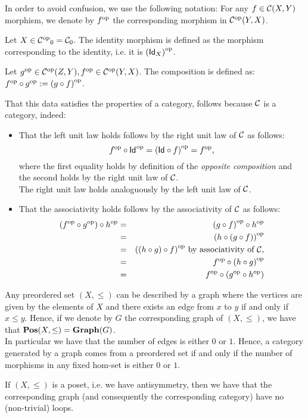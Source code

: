 \begin{solution}\label{sol:opposite}
  In order to avoid confusion, we use the following notation: For any $f\in\CHom{\CC}{X}{Y}$ morphism, we denote by $\op{f}$ the corresponding morphism in $\CHom{\op\CC}{Y}{X}$.
  
  Let $X\in \Ob{\op\CC} = \Ob{\CC}$. The identity morphism is defined as the morphism corresponding to the identity, i.e. it is $\op{(\Id[X])}$.
  
  Let $\op{g} \in \CHom{\op\CC}{Z}{Y}, \op{f}\in \CHom{\op\CC}{Y}{X}$. The composition is defined as: $\co{\op g}{\op f} := \op{(\co{f}{g})}$.
  
That this data satisfies the properties of a category, follows because $\CC$ is a category, indeed:
\begin{itemize}
\item That the left unit law holds follows by the right unit law of $\CC$ as follows:
\[
\co{\op{\Id}}{\op{f}} = \op{(\co{f}{\Id})} = \op{f},
\]
where the first equality holds by definition of the \textit{opposite composition} and the second holds by the right unit law of $\CC$.\\
The right unit law holds analoguously by the left unit law of $\CC$.
\item That the associativity holds follows by the associativity of $\CC$ as follows:
\begin{eqnarray*}
\co{\op{h}}{(\co{\op g}{\op f})} &=& \co{\op{h}}{\op{(\co{f}{g})}}\\
 	&=& \op{(\co{(\co{f}{g})}{h})}\\ 
 	&=& \op{(\co{f}{(\co{g}{h})})} \text{ by associativity of $\CC$},\\
 	&=& \co{\op{(\co{g}{h})}}{\op f}\\
 	&=& \co{(\co{\op h}{\op g})}{\op f}
\end{eqnarray*}
\end{itemize}
\end{solution}

\begin{solution}\label{sol:connection_graphs_preordersets}
Any preordered set $(X,\leq)$ can be described by a graph where the vertices are given by the elements of $X$ and there exists an edge from $x$ to $y$ if and only if $x \leq y$. Hence, if we denote by $G$ the corresponding graph of $(X,\leq)$, we have that $\POS(X,\leq) = \mathbf{Graph}(G)$.\\
In particular we have that the number of edges is either $0$ or $1$. Hence, a category generated by a graph comes from a preordered set if and only if the number of morphisms in any fixed hom-set is either $0$ or $1$.

If $(X,\leq)$ is a poset, i.e. we have antisymmetry, then we have that the corresponding graph (and consequently the corresponding category) have no (non-trivial) loops.
\end{solution}


